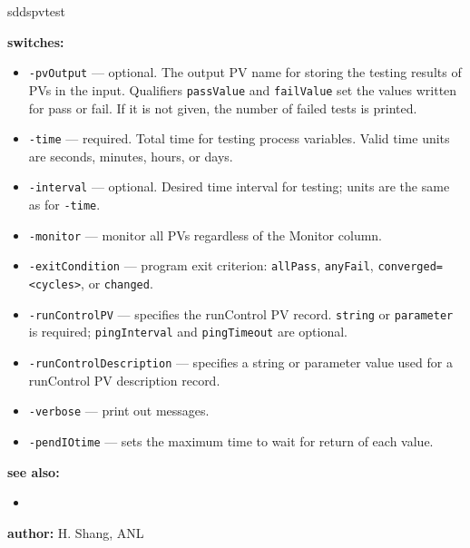 \begin{sddsprog}{sddspvtest}
\item \textbf{switches:}
\begin{itemize}
  \item {\tt -pvOutput} --- optional. The output PV name for storing the testing results
               of PVs in the input. Qualifiers \verb|passValue| and \verb|failValue| set
               the values written for pass or fail. If it is not given, the number of
               failed tests is printed.
  \item {\tt -time} --- required. Total time for testing process variables.
               Valid time units are seconds, minutes, hours, or days.
  \item {\tt -interval} --- optional. Desired time interval for testing; units are the
               same as for \verb|-time|.
  \item {\tt -monitor} --- monitor all PVs regardless of the Monitor column.
  \item {\tt -exitCondition} --- program exit criterion: \verb|allPass|, \verb|anyFail|,
               \verb|converged=<cycles>|, or \verb|changed|.
  \item {\tt -runControlPV} --- specifies the runControl PV record. \verb|string| or
               \verb|parameter| is required; \verb|pingInterval| and \verb|pingTimeout|
               are optional.
  \item {\tt -runControlDescription} --- specifies a string or parameter value used
               for a runControl PV description record.
  \item {\tt -verbose} --- print out messages.
  \item {\tt -pendIOtime} --- sets the maximum time to wait for return of each value.
\end{itemize}
\item \textbf{see also:}
\begin{itemize}
  \item {}
\end{itemize}
\item \textbf{author:} H. Shang, ANL
\end{sddsprog}
